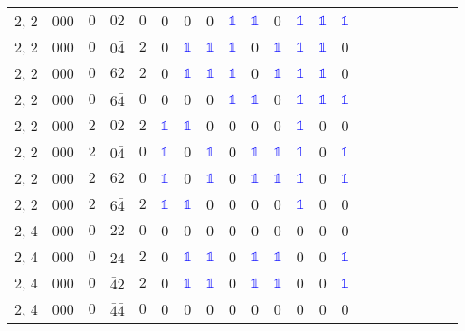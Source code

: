\begin{longtable*}{c| cccccccccccccccccccc }
2, 2& 000& $0$& $02$& $0$& 0& 0& 0& \textcolor{blue}{$\mathds{1}$}& \textcolor{blue}{$\mathds{1}$}& 0& \textcolor{blue}{$\mathds{1}$}& \textcolor{blue}{$\mathds{1}$}& \textcolor{blue}{$\mathds{1}$}\\
2, 2& 000& $0$& $0\bar{4}$& $2$& 0& \textcolor{blue}{$\mathds{1}$}& \textcolor{blue}{$\mathds{1}$}& \textcolor{blue}{$\mathds{1}$}& 0& \textcolor{blue}{$\mathds{1}$}& \textcolor{blue}{$\mathds{1}$}& \textcolor{blue}{$\mathds{1}$}& 0\\
2, 2& 000& $0$& $62$& $2$& 0& \textcolor{blue}{$\mathds{1}$}& \textcolor{blue}{$\mathds{1}$}& \textcolor{blue}{$\mathds{1}$}& 0& \textcolor{blue}{$\mathds{1}$}& \textcolor{blue}{$\mathds{1}$}& \textcolor{blue}{$\mathds{1}$}& 0\\
2, 2& 000& $0$& $6\bar{4}$& $0$& 0& 0& 0& \textcolor{blue}{$\mathds{1}$}& \textcolor{blue}{$\mathds{1}$}& 0& \textcolor{blue}{$\mathds{1}$}& \textcolor{blue}{$\mathds{1}$}& \textcolor{blue}{$\mathds{1}$}\\
2, 2& 000& $2$& $02$& $2$& \textcolor{blue}{$\mathds{1}$}& \textcolor{blue}{$\mathds{1}$}& 0& 0& 0& 0& \textcolor{blue}{$\mathds{1}$}& 0& 0\\
2, 2& 000& $2$& $0\bar{4}$& $0$& \textcolor{blue}{$\mathds{1}$}& 0& \textcolor{blue}{$\mathds{1}$}& 0& \textcolor{blue}{$\mathds{1}$}& \textcolor{blue}{$\mathds{1}$}& \textcolor{blue}{$\mathds{1}$}& 0& \textcolor{blue}{$\mathds{1}$}\\
2, 2& 000& $2$& $62$& $0$& \textcolor{blue}{$\mathds{1}$}& 0& \textcolor{blue}{$\mathds{1}$}& 0& \textcolor{blue}{$\mathds{1}$}& \textcolor{blue}{$\mathds{1}$}& \textcolor{blue}{$\mathds{1}$}& 0& \textcolor{blue}{$\mathds{1}$}\\
2, 2& 000& $2$& $6\bar{4}$& $2$& \textcolor{blue}{$\mathds{1}$}& \textcolor{blue}{$\mathds{1}$}& 0& 0& 0& 0& \textcolor{blue}{$\mathds{1}$}& 0& 0\\
2, 4& 000& $0$& $22$& $0$& 0& 0& 0& 0& 0& 0& 0& 0& 0\\
2, 4& 000& $0$& $2\bar{4}$& $2$& 0& \textcolor{blue}{$\mathds{1}$}& \textcolor{blue}{$\mathds{1}$}& 0& \textcolor{blue}{$\mathds{1}$}& \textcolor{blue}{$\mathds{1}$}& 0& 0& \textcolor{blue}{$\mathds{1}$}\\
2, 4& 000& $0$& $\bar{4}2$& $2$& 0& \textcolor{blue}{$\mathds{1}$}& \textcolor{blue}{$\mathds{1}$}& 0& \textcolor{blue}{$\mathds{1}$}& \textcolor{blue}{$\mathds{1}$}& 0& 0& \textcolor{blue}{$\mathds{1}$}\\
2, 4& 000& $0$& $\bar{4}\bar{4}$& $0$& 0& 0& 0& 0& 0& 0& 0& 0& 0\\

\end{longtable*}
